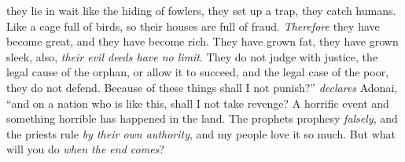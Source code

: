 \begin{biblechapter}
they lie in wait like the hiding of fowlers, 
they set up a trap, 
they catch humans.
\verse Like a cage full of birds, 
so their houses are full of fraud. 
\textit{Therefore} they have become great, 
and they have become rich.
\verse They have grown fat, 
they have grown sleek, 
also, \textit{their evil deeds have no limit}. 
They do not judge with justice, 
the legal cause of the orphan, 
or allow it to succeed, 
and the legal case of the poor, 
they do not defend.
\verse Because of these things shall I not punish?” \textit{declares} Adonai, 
“and on a nation who is like this, shall I not take revenge?
\verse A horrific event and something horrible has happened in the land.
\verse The prophets prophesy \textit{falsely}, 
and the priests rule \textit{by their own authority}, 
and my people love it so much. 
But what will you do \textit{when the end comes}?
\end{biblechapter}

